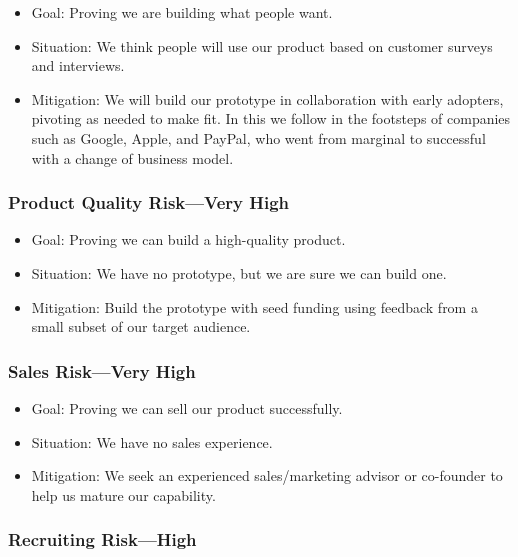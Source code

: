 \documentclass[10pt,openany]{book}
\providecommand{\tightlist}{%
  \setlength{\itemsep}{0pt}\setlength{\parskip}{0pt}}
\begin{document}
\begin{itemize}
\tightlist
\item
  Goal: Proving we are building what people want.
\item
  Situation: We think people will use our product based on customer
  surveys and interviews.
\item
  Mitigation: We will build our prototype in collaboration with early
  adopters, pivoting as needed to make fit. In this we follow in the
  footsteps of companies such as Google, Apple, and PayPal, who went
  from marginal to successful with a change of business model.
\end{itemize}

\hypertarget{product-quality-riskvery-high}{%
\subsubsection{Product Quality Risk---Very
High}\label{product-quality-riskvery-high}}

\begin{itemize}
\tightlist
\item
  Goal: Proving we can build a high-quality product.
\item
  Situation: We have no prototype, but we are sure we can build one.
\item
  Mitigation: Build the prototype with seed funding using feedback from
  a small subset of our target audience.
\end{itemize}

\hypertarget{sales-riskvery-high}{%
\subsubsection{Sales Risk---Very High}\label{sales-riskvery-high}}

\begin{itemize}
\tightlist
\item
  Goal: Proving we can sell our product successfully.
\item
  Situation: We have no sales experience.
\item
  Mitigation: We seek an experienced sales/marketing advisor or
  co-founder to help us mature our capability.
\end{itemize}

\hypertarget{recruiting-riskhigh}{%
\subsubsection{Recruiting Risk---High}\label{recruiting-riskhigh}}
\end{document}
